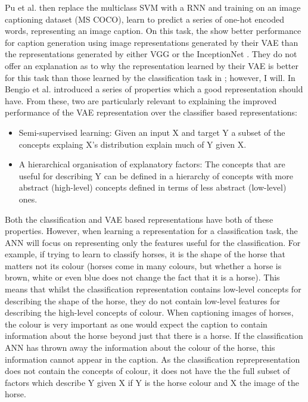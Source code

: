 Pu et al. then replace the multiclass \ac{SVM} with a \ac{RNN} and training on an image captioning dataset (MS COCO\cite{lin2014microsoft}), learn to predict a series of one-hot encoded words, representing an image caption. On this task, the show better performance for caption generation using image representations generated by their \ac{VAE} than the representations generated by either VGG \cite{simonyan2014very} or the InceptionNet \cite{szegedy2015going}. They do not offer an explanation as to why the representation learned by their \ac{VAE} is better for this task than those learned by the classification task in \cite{simonyan2014very, szegedy2015going}; however, I will.
In \cite{repRev} Bengio et al. introduced a series of properties which a good representation should have. From these, two are particularly relevant to explaining the improved performance of the \ac{VAE} representation over the classifier based representations:
\\
\begin{itemize}
	\item Semi-supervised learning: Given an input X and target Y a subset of the concepts explaing X's distribution explain much of Y given X.
	\item A hierarchical organisation of explanatory factors: The concepts that are useful for describing Y can be defined in a hierarchy of concepts with more abstract (high-level) concepts defined in terms of less abstract (low-level) ones.
	\vspace{1em}
\end{itemize}


Both the classification and \ac{VAE} based representations have both of these properties. However, when learning a representation for a classification task, the \ac{ANN} will focus on representing only the features useful for the classification. For example, if trying to learn to classify horses, it is the shape of the horse that matters not its colour (horses come in many colours, but whether a horse is brown, white or even blue does not change the fact that it is a horse). This means that whilst the classification representation contains low-level concepts for describing the shape of the horse, they do not contain low-level features for describing the high-level concepts of colour.
When captioning images of horses, the colour is very important as one would expect the caption to contain information about the horse beyond just that there is a horse. If the classification \ac{ANN} has thrown away the information about the colour of the horse, this information cannot appear in the caption. As the classification reprepresentation does not contain the concepts of colour, it does not have the the full subset of factors which describe Y given X if Y is the horse colour and X the image of the horse.

